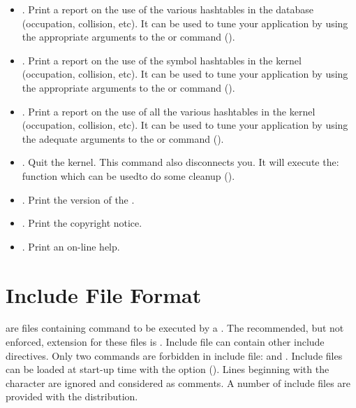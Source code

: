 \begin{itemize}
\item {}. Print a report on the use of the
various hashtables in the database (occupation, collision, etc). It can be
used to tune your application by using the appropriate arguments to the
 or  command ().

\item {}. Print a report on the use of the
symbol hashtables in the kernel (occupation, collision, etc). It can be used
to tune your application by using the appropriate arguments to the 
or  command ().

\item {}. Print a report on the use of all
the various hashtables in the kernel (occupation, collision, etc). It can be
used to tune your application by using the adequate arguments to the 
or  command ().

\item {}. Quit the kernel. This command also disconnects
you. It will execute the:\*
\*
function which can be usedto do some cleanup ().

\item {}. Print the version of the \CPK{}.

\item {}. Print the copyright notice.

\item {}. Print an on-line help.

\end{itemize}

\section{Include File Format}

 are files containing command to be executed by a \CPK{}. The
recommended, but not enforced, extension for these files is .
Include file can contain other include directives. Only two commands are
forbidden in include file:  and . Include files
can be loaded at start-up time with the  option (). Lines beginning with the \samp{;} character are ignored and
considered as comments. A number of include files are provided with the
\COPRSDE{} distribution. 

